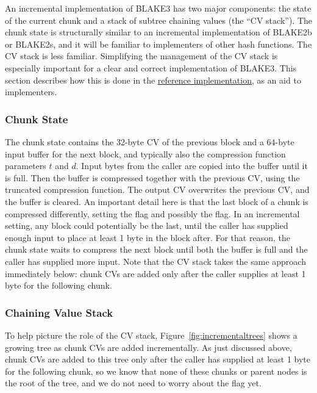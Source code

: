 \documentclass[11pt,notitlepage,a4paper]{article}
\newcommand{\flag}[1]{\texttt{\detokenize{#1}}\xspace}
\begin{document}
An incremental implementation of BLAKE3 has two major components: the state of
the current chunk and a stack of subtree chaining values (the ``CV stack'').
The chunk state is structurally similar to an incremental implementation of
BLAKE2b or BLAKE2s, and it will be familiar to implementers of other hash
functions. The CV stack is less familiar. Simplifying the management of the CV
stack is especially important for a clear and correct implementation of BLAKE3.
This section describes how this is done in the
\href{https://github.com/BLAKE3-team/BLAKE3/blob/master/reference_impl/reference_impl.rs}{reference
implementation}, as an aid to implementers.

\subsubsection{Chunk State}\label{sec:chunkstate}

The chunk state contains the 32-byte CV of the previous block and a 64-byte
input buffer for the next block, and typically also the compression function
parameters $t$ and $d$. Input bytes from the caller are copied into the buffer
until it is full. Then the buffer is compressed together with the previous CV,
using the truncated compression function. The output CV overwrites the previous
CV, and the buffer is cleared. An important detail here is that the last block
of a chunk is compressed differently, setting the \flag{CHUNK_END} flag and
possibly the \flag{ROOT} flag. In an incremental setting, any block could
potentially be the last, until the caller has supplied enough input to place at
least 1 byte in the block after. For that reason, the chunk state waits to
compress the next block until both the buffer is full and the caller has
supplied more input. Note that the CV stack takes the same approach immediately
below: chunk CVs are added only after the caller supplies at least 1 byte for
the following chunk.

\subsubsection{Chaining Value Stack}\label{sec:cvstack}

To help picture the role of the CV stack, Figure~\ref{fig:incrementaltrees}
shows a growing tree as chunk CVs are added incrementally. As just discussed
above, chunk CVs are added to this tree only after the caller has supplied at
least 1 byte for the following chunk, so we know that none of these chunks or
parent nodes is the root of the tree, and we do not need to worry about the
\flag{ROOT} flag yet.
\end{document}
